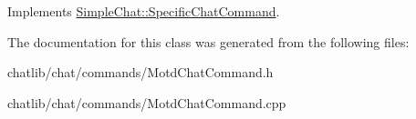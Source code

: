 Implements \hyperlink{classSimpleChat_1_1SpecificChatCommand}{Simple\-Chat\-::\-Specific\-Chat\-Command}.



The documentation for this class was generated from the following files\-:\begin{DoxyCompactItemize}
\item 
chatlib/chat/commands/Motd\-Chat\-Command.\-h\item 
chatlib/chat/commands/Motd\-Chat\-Command.\-cpp\end{DoxyCompactItemize}
